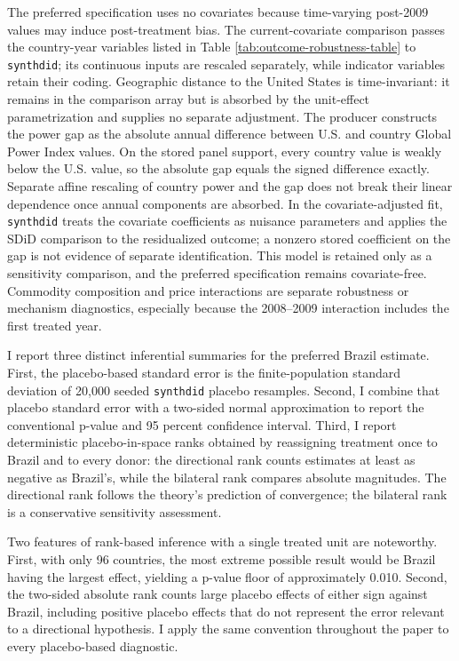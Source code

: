 \documentclass[referee,pdflatex,sn-basic]{sn-jnl}
\theoremstyle{thmstylethree}
\begin{document}
The preferred specification uses no covariates because time-varying post-2009 values may induce post-treatment bias. The current-covariate comparison passes the country-year variables listed in Table \ref{tab:outcome-robustness-table} to \texttt{synthdid}; its continuous inputs are rescaled separately, while indicator variables retain their coding. Geographic distance to the United States is time-invariant: it remains in the comparison array but is absorbed by the unit-effect parametrization and supplies no separate adjustment. The producer constructs the power gap as the absolute annual difference between U.S. and country Global Power Index values. On the stored panel support, every country value is weakly below the U.S. value, so the absolute gap equals the signed difference exactly. Separate affine rescaling of country power and the gap does not break their linear dependence once annual components are absorbed. In the covariate-adjusted fit, \texttt{synthdid} treats the covariate coefficients as nuisance parameters and applies the SDiD comparison to the residualized outcome; a nonzero stored coefficient on the gap is not evidence of separate identification. This model is retained only as a sensitivity comparison, and the preferred specification remains covariate-free. Commodity composition and price interactions are separate robustness or mechanism diagnostics, especially because the 2008--2009 interaction includes the first treated year.

I report three distinct inferential summaries for the preferred Brazil estimate. First, the placebo-based standard error is the finite-population standard deviation of 20,000 seeded \texttt{synthdid} placebo resamples. Second, I combine that placebo standard error with a two-sided normal approximation to report the conventional p-value and 95 percent confidence interval. Third, I report deterministic placebo-in-space ranks obtained by reassigning treatment once to Brazil and to every donor: the directional rank counts estimates at least as negative as Brazil's, while the bilateral rank compares absolute magnitudes. The directional rank follows the theory's prediction of convergence; the bilateral rank is a conservative sensitivity assessment.

Two features of rank-based inference with a single treated unit are noteworthy. First, with only 96 countries, the most extreme possible result would be Brazil having the largest effect, yielding a p-value floor of approximately 0.010. Second, the two-sided absolute rank counts large placebo effects of either sign against Brazil, including positive placebo effects that do not represent the error relevant to a directional hypothesis. I apply the same convention throughout the paper to every placebo-based diagnostic.
\end{document}
